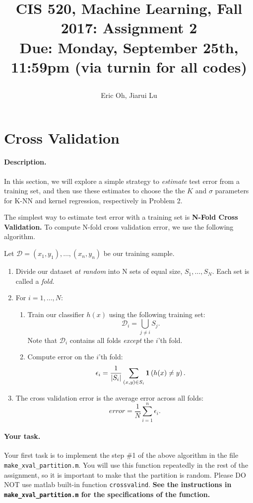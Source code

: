 \documentclass[english]{article}
\title{CIS 520, Machine Learning, Fall 2017: Assignment 2\\
Due: Monday, September 25th, 11:59pm (via turnin for all codes)
\author{Eric Oh, Jiarui Lu}
\ifthenelse{\boolean{ShowSolutions}}{ \\ \bf Solutions }{} }
\date{}
\begin{document}
\maketitle


\section{Cross Validation }

\paragraph{Description.} In this section, we will explore a simple
strategy to {\em estimate} test error from a training set, and then use these estimates to choose the the $K$ and $\sigma$ parameters for
K-NN and kernel regression, respectively in Problem 2.

The simplest way to estimate test error with a training set is {\bf
  N-Fold Cross Validation.} To compute N-fold cross validation error,
we use the following algorithm. 

Let $\mathcal{D} = (x_1, y_1), \dots,
(x_n, y_n)$ be our training sample.
\begin{enumerate}
\item Divide our dataset {\em at random} into N sets of equal size, $S_1, \dots,
  S_N$. Each set is called a {\em fold.}
\item For $i = 1, \dots, N:$ 
  \begin{enumerate}
  \item Train our classifier $h(x)$ using the following training set:
    $$\mathcal{D}_i = \bigcup_{j\ne i} S_j.$$
    Note that $\mathcal{D}_i$ contains all folds {\em except} the $i$'th fold.
  \item Compute error on the $i$'th fold:
    $$\epsilon_i = \frac{1}{|S_i|}\sum_{(x,y) \in S_i} \mathbf{1}\left(h(x) \ne y\right).$$
  \end{enumerate}
\item The cross validation error is the average error across all folds:
  $$error = \frac{1}{N} \sum_{i=1}^n \epsilon_i.$$
\end{enumerate}

\paragraph{Your task.} Your first task is to implement the step \#1 of the above algorithm in the file {\tt make\_xval\_partition.m}. 
You will use this function repeatedly in the rest of the assignment, so it is important to make that the partition is random. 
Please DO NOT use matlab built-in function {\tt crossvalind}. {\bf See the instructions in {\tt make\_xval\_partition.m} for the specifications of the function.}
\end{document}
